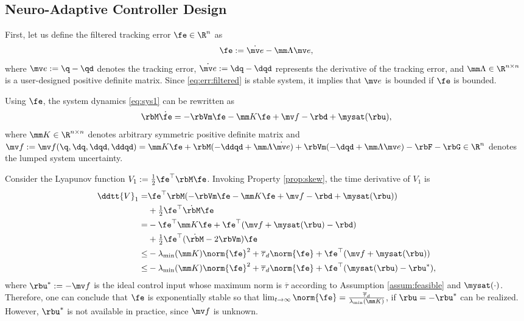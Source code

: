 \documentclass[final,5p,times,twocolumn,authoryear]{elsarticle}
\begin{document}
\subsection{Neuro-Adaptive Controller Design}\label{sec:sub:NAC}

First, let us define the filtered tracking error $\fe\in\R^n$ as 
\begin{equation}
    \fe := \dot{\mv e}-\mm\Lambda \mv e
    ,
    \label{eq:err:filtered}
\end{equation}
where $\mv e := \q - \qd$ denotes the tracking error, $\dot{\mv e} := \dq - \dqd$ represents the derivative of the tracking error, and $\mm\Lambda\in\R^{n\times n}$ is a user-designed positive definite matrix.
Since \eqref{eq:err:filtered} is stable system, it implies that $\mv e$ is bounded if $\fe$ is bounded.

Using $\fe$, the system dynamics \eqref{eq:sys1} can be rewritten as
\begin{equation}
    \rbM \dot\fe
    =
    -\rbVm \fe
    -\mm K \fe
    + \mv f
    -\rbd + \mysat(\rbu)
    ,
    \label{eq:sys:filtered}
\end{equation}
where $\mm K\in\R^{n\times n}$ denotes arbitrary symmetric positive definite matrix and $
    \mv f:= \mv f(\q,\dq,\dqd,\ddqd)
    =
    \mm K \fe
    +\rbM(-\ddqd+\mm\Lambda\dot{\mv e})
    +
    \rbVm(-\dqd+\mm\Lambda\mv e)
    -
    \rbF
    -
    \rbG
    \in\R^n
$ denotes the lumped system uncertainty.

Consider the Lyapunov function $V_1:= \tfrac{1}{2}\fe^\top \rbM\fe$. 
Invoking Property \ref{prop:skew}, the time derivative of $V_1$ is
\begin{equation}
    \begin{aligned}
        \ddtt{V}_1
        =&
        \fe^\top \rbM (
            -\rbVm \fe -\mm K \fe + \mv f
            -\rbd + \mysat(\rbu)
        )
        \\
        &
        +
        \tfrac{1}{2}
        \fe^\top \dot{\rbM}\fe
        \\
        =&
        -
        \fe^\top \mm K \fe 
        +
        \fe^\top (
            \mv f+\mysat(\rbu)
            -\rbd
        )
        \\
        &
        +
        \tfrac{1}{2}
        \fe^\top(\dot{\rbM}- 2\rbVm)\fe
        \\
        \le&
        -\lambda_{\min}(\mm K)\norm{\fe}^2
        +
        \overline\tau_d\norm{\fe}
        +
        \fe^\top (\mv f+\mysat(\rbu))
        \\
        \le&
        -\lambda_{\min}(\mm K)\norm{\fe}^2
        +
        \overline\tau_d\norm{\fe}
        +
        \fe^\top (\mysat(\rbu)-\rbu^*)
        ,
    \end{aligned}
    \label{eq:lya1:dot1}
\end{equation}
where $\rbu^*:= -\mv f$ is the ideal control input whose maximum norm is $\overline\tau$ according to Assumption \ref{assum:feasible} and $\mysat(\cdot)$. 
Therefore, one can conclude that $\fe$ is exponentially stable so that $\lim_{t\to\infty}\norm{\fe}=\tfrac{\overline\tau_d}{\lambda_{\min}(\mm K)}$, if $\rbu=-\rbu^*$ can be realized.
However, $\rbu^*$ is not available in practice, since $\mv f$ is unknown.
\end{document}
